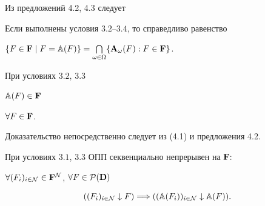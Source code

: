 Из предложений 4.2, 4.3 следует





\begin{props}


Если выполнены условия $3.2$--$3.4$, то справедливо равенство


$\{F \in {\bold F} \mid F = {\Bbb A}(F)\} = {\bigcap\limits_{\omega \in


\Om}}\{{{\bold A}_\omega}(F):F \in {\bold F}\}$.


\end{props}





\begin{props}


При условиях $3.2$, $3.3$


${\Bbb A}(F) \in {\bold F}$\;


$\forall{F} \in {\bold F}$.


\end{props}





Доказательство непосредственно следует из (4.1) и предложения 4.2.





\begin{props}


При условиях $3.1$, $3.3$ ОПП секвенциально непрерывен на ${\bold F}{:}$


$\fo{(F_i)_{i \in {\cal N}}} \in {{\bold F}^{\cal N}}$, $\fo{F} \in


{{\cal P}({\bold D})}$


\begin{equation}


({(F_i)_{i \in {\cal N}}} \downarrow F) \Lo


({({\Bbb A}(F_i))_{i \in {\cal N}}} \downarrow {{\Bbb A}(F)}).


\end{equation}


\end{props}





